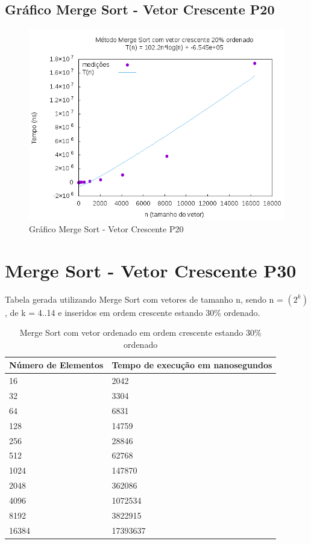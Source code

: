 \documentclass[12pt,a4paper,twoside]{report}
\begin{document}
\subsection{Gráfico Merge Sort - Vetor Crescente P20}
\begin{figure}[H]
    \centering
    \includegraphics[width=0.7\linewidth]{graficos/MergeSort/vIntCrescenteP20/vIntCrescenteP20.png}
  \caption{Gráfico Merge Sort - Vetor Crescente P20}
\end{figure}

\section{Merge Sort - Vetor Crescente P30}
Tabela gerada utilizando Merge Sort com vetores de tamanho n, sendo n = $(2^k)$, de k = 4..14 e inseridos em ordem crescente estando 30\% ordenado.
\begin{table}[H]
\centering
\caption{Merge Sort com vetor ordenado em ordem crescente estando 30\% ordenado}
\label{my-label}
\begin{tabular}{|l|l|}
\hline
\multicolumn{1}{|c|}{\textbf{Número de Elementos}} & \multicolumn{1}{c|}{\textbf{Tempo de execução em nanosegundos}} \\ \hline
16 & 2042 \\ \hline
32 & 3304 \\ \hline
64 & 6831 \\ \hline
128 & 14759 \\ \hline
256 & 28846 \\ \hline
512 & 62768 \\ \hline
1024 & 147870 \\ \hline
2048 & 362086 \\ \hline
4096 & 1072534 \\ \hline
8192 & 3822915 \\ \hline
16384 & 17393637 \\ \hline
\end{tabular}
\end{table}
\end{document}
